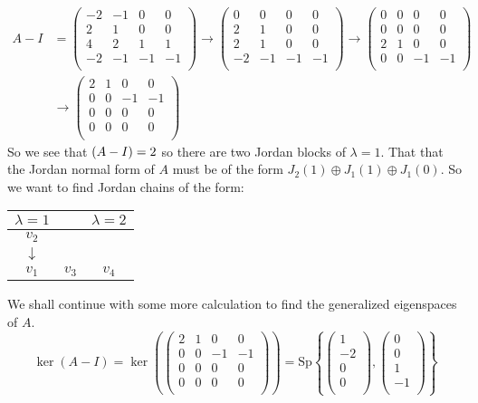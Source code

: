 \documentclass[11pt,a4paper]{article}
\theoremstyle{plain}
\newcommand{\Sp}{\text{Sp}}
\begin{document}
	\begin{align*}
			A-I &= 
	\begin{pmatrix}
		-2 & -1 & 0 & 0\\
		2 & 1 & 0 & 0\\
		4 & 2 & 1 & 1\\
		-2 & -1 & -1 & -1\\
	\end{pmatrix} \to
	\begin{pmatrix}
		0 & 0 & 0 & 0\\
		2 & 1 & 0 & 0\\
		2 & 1 & 0 & 0\\
		-2 & -1 & -1 & -1\\
	\end{pmatrix} \to
	\begin{pmatrix}
		0 & 0 & 0 & 0\\
		0 & 0 & 0 & 0\\
		2 & 1 & 0 & 0\\
		0 & 0 & -1 & -1\\
	\end{pmatrix} \\ &\to
	\begin{pmatrix}
		2 & 1 & 0 & 0\\
		0 & 0 & -1 & -1\\
		0 & 0 & 0 & 0\\
		0 & 0 & 0 & 0\\
	\end{pmatrix}
	\end{align*}
	So we see that $\null(A-I) = 2$ so there are two Jordan blocks of 
	$\lambda = 1$. That that the Jordan normal form of $A$ must be
	of the form $J_2(1) \oplus J_1(1) \oplus J_1(0)$. So we want to find
	Jordan chains of the form:
	\begin{center}
	\begin{tabular}{c c | c} 
	 $\lambda=1$ &  & $\lambda=2$ \\
	 \hline
	 $v_2$ &  &  \\ 
	 $\downarrow$ &  &  \\
	 $v_1$ & $v_3$ & $v_4$ \\
	\end{tabular}
	\end{center}
	We shall continue with some more calculation to find the generalized
	eigenspaces of $A$.	
	\[
		\ker(A-I) = \ker\left(
		\begin{pmatrix}
		2 & 1 & 0 & 0\\
		0 & 0 & -1 & -1\\
		0 & 0 & 0 & 0\\
		0 & 0 & 0 & 0\\
		\end{pmatrix}\right) = 
		\Sp
		\left\{ \begin{pmatrix} 1\\ -2\\ 0\\ 0\\ \end{pmatrix},
		   \begin{pmatrix} 0\\ 0\\ 1\\ -1\\ \end{pmatrix} \right\}
	\]
\end{document}
